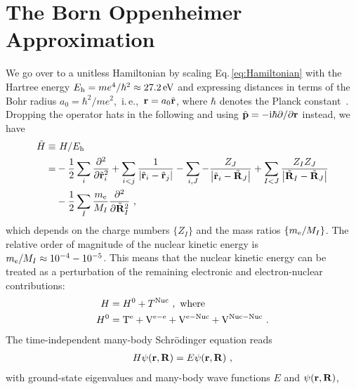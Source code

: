 \section{The Born Oppenheimer Approximation}
We go over to a unitless Hamiltonian by scaling Eq.\,\eqref{eq:Hamiltonian} with the Hartree energy $E_{\rm h} = me^4 / \hbar^2 \approx 27.2\,{\rm eV}$ and expressing distances in terms of the Bohr radius $a_0 = \hbar^2 / m e^2$,~i.\,e.,~${\bf r} = a_0 \tilde{\bf r}$, where $\hbar$ denotes the Planck constant~. Dropping the operator hats in the following and using $\hat{\bf p}=-{\rm i} \hbar \partial / \partial {\bf r}$ instead, we have
\begin{align}
\begin{split}
    \tilde H 
        \equiv& ~H / E_{\rm h} \\
        =& 
        - \frac{1}{2} \sum_i \frac{\partial^2}{\partial \tilde{\bf r}_i^2}
        + \sum_{i < j} \frac{1}{\left|\tilde{\b r}_{i}-\tilde{\bf r}_{j}\right|}
        - \sum_{i, J} -\frac{Z_J}{\left|\tilde{\b r}_{i}-\tilde{\bf R}_{J}\right|}
        + \sum_{I < J} \frac{Z_{I} Z_{J}}{
            \left|\tilde{\b R}_{I}-\tilde{\bf R}_{J}\right|} 
        \\
        &- \frac{1}{2} \sum_I \frac{m_{\rm e}}{M_I} \frac{\partial^2}{\partial \tilde{\bf R}_I^2}~,
    \label{eq:Hscaled}
\end{split}
\end{align}
which depends on the charge numbers $\{Z_I\}$ and the mass ratios $\{ m_{\rm e} / M_I \}$. The relative order of magnitude of the nuclear kinetic energy is $m_{\rm e} / M_I \approx 10^{-4} - 10^{-5}$. This means that the nuclear kinetic energy can be treated as a perturbation of the remaining electronic and electron-nuclear contributions:
\begin{align}
    H   &= H^0 + T^{\rm Nuc}~, \text{ where} 
    \label{eq:H=H0+T}
    \\
    H^0 &=
        {\mathrm{T}}^{\mathrm{e}}
        + {\mathrm{V}}^{\mathrm{e}-\mathrm{e}}
        + {\mathrm{V}}^{\mathrm{e}-\mathrm{Nuc}}
        + {\mathrm{V}}^{\mathrm{Nuc}-\mathrm{Nuc}}~.
    \label{eq:H0}
\end{align}
The time-independent many-body Schr\"odinger equation reads
\begin{align}
    H \psi ({\bf r}, {\bf R}) = E \psi ({\bf r}, {\bf R})~,
    \label{eq:Schroedinger1}
\end{align}
with ground-state eigenvalues and many-body wave functions $E$ and \mbox{$\psi ({\bf r}, {\bf R})$},
